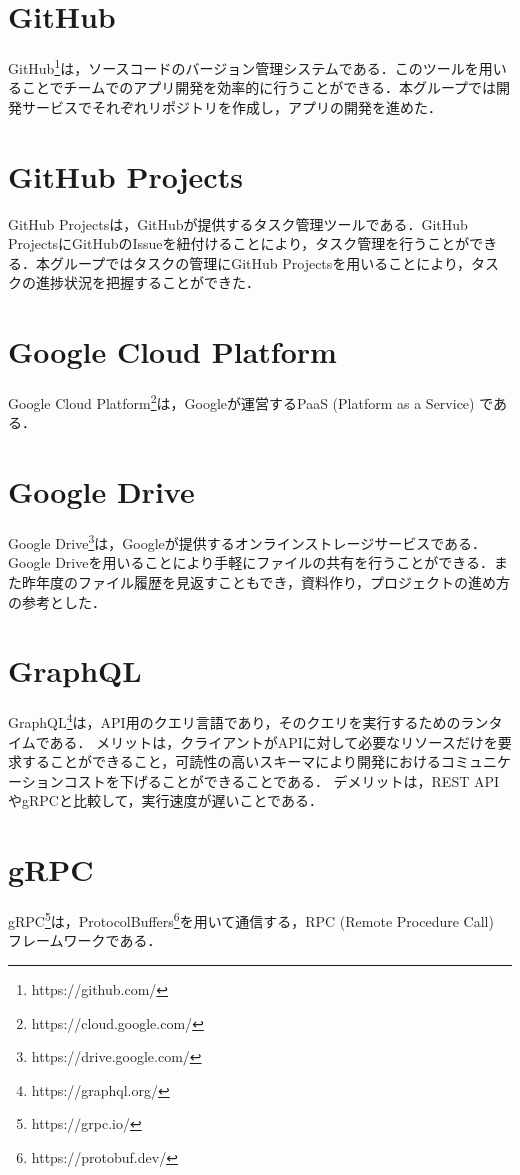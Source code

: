 \section{GitHub}
GitHub\footnote{https://github.com/}は，ソースコードのバージョン管理システムである．このツールを用いることでチームでのアプリ開発を効率的に行うことができる．本グループでは開発サービスでそれぞれリポジトリを作成し，アプリの開発を進めた．

\section{GitHub Projects}
GitHub Projectsは，GitHubが提供するタスク管理ツールである．GitHub ProjectsにGitHubのIssueを紐付けることにより，タスク管理を行うことができる．本グループではタスクの管理にGitHub Projectsを用いることにより，タスクの進捗状況を把握することができた．

\section{Google Cloud Platform}
Google Cloud Platform\footnote{https://cloud.google.com/}は，Googleが運営するPaaS (Platform as a Service) である．

\section{Google Drive}
Google Drive\footnote{https://drive.google.com/}は，Googleが提供するオンラインストレージサービスである．Google Driveを用いることにより手軽にファイルの共有を行うことができる．また昨年度のファイル履歴を見返すこともでき，資料作り，プロジェクトの進め方の参考とした．

\section{GraphQL}
GraphQL\footnote{https://graphql.org/}は，API用のクエリ言語であり，そのクエリを実行するためのランタイムである．
メリットは，クライアントがAPIに対して必要なリソースだけを要求することができること，可読性の高いスキーマにより開発におけるコミュニケーションコストを下げることができることである．
デメリットは，REST APIやgRPCと比較して，実行速度が遅いことである．

\section{gRPC}
gRPC\footnote{https://grpc.io/}は，ProtocolBuffers\footnote{https://protobuf.dev/}を用いて通信する，RPC (Remote Procedure Call) フレームワークである．

